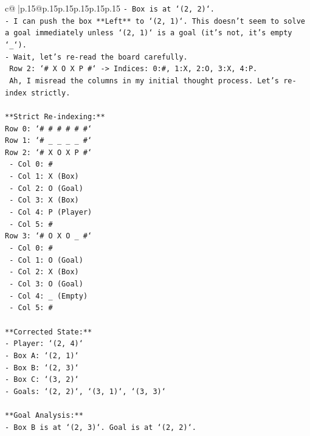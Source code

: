 \documentclass{article}
\begin{document}
{\begin{supertabular}{c@{$\;$}|p{.15\linewidth}@{}p{.15\linewidth}p{.15\linewidth}p{.15\linewidth}p{.15\linewidth}p{.15\linewidth}}
{{{\texttt{{-} Box is at `(2, 2)`.} \\
\texttt{{-} I can push the box **Left** to `(2, 1)`. This doesn't seem to solve a goal immediately unless `(2, 1)` is a goal (it's not, it's empty `\_`).} \\
\texttt{{-} Wait, let's re{-}read the board carefully.} \\
\texttt{  Row 2: `\# X O X P \#` {-}> Indices: 0:\#, 1:X, 2:O, 3:X, 4:P.} \\
\texttt{  Ah, I misread the columns in my initial thought process. Let's re{-}index strictly.} \\
\\ 
\texttt{**Strict Re{-}indexing:**} \\
\texttt{Row 0: `\# \# \# \# \# \#`} \\
\texttt{Row 1: `\# \_ \_ \_ \_ \#`} \\
\texttt{Row 2: `\# X O X P \#`} \\
\texttt{   {-} Col 0: \#} \\
\texttt{   {-} Col 1: X (Box)} \\
\texttt{   {-} Col 2: O (Goal)} \\
\texttt{   {-} Col 3: X (Box)} \\
\texttt{   {-} Col 4: P (Player)} \\
\texttt{   {-} Col 5: \#} \\
\texttt{Row 3: `\# O X O \_ \#`} \\
\texttt{   {-} Col 0: \#} \\
\texttt{   {-} Col 1: O (Goal)} \\
\texttt{   {-} Col 2: X (Box)} \\
\texttt{   {-} Col 3: O (Goal)} \\
\texttt{   {-} Col 4: \_ (Empty)} \\
\texttt{   {-} Col 5: \#} \\
\\ 
\texttt{**Corrected State:**} \\
\texttt{{-} Player: `(2, 4)`} \\
\texttt{{-} Box A: `(2, 1)`} \\
\texttt{{-} Box B: `(2, 3)`} \\
\texttt{{-} Box C: `(3, 2)`} \\
\texttt{{-} Goals: `(2, 2)`, `(3, 1)`, `(3, 3)`} \\
\\ 
\texttt{**Goal Analysis:**} \\
\texttt{{-} Box B is at `(2, 3)`. Goal is at `(2, 2)`.} \\
}}}
\end{supertabular}}
\end{document}
